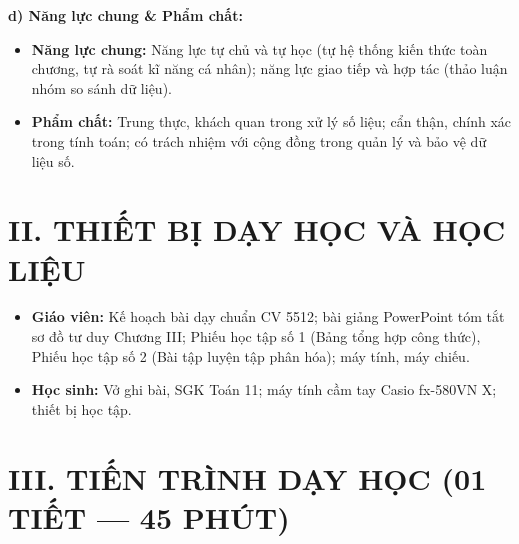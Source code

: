 \documentclass[12pt, a4paper]{article}
\begin{document}
\textbf{d) Năng lực chung \& Phẩm chất:}
\begin{itemize}[leftmargin=1.5em]
    \item \textbf{Năng lực chung:} Năng lực tự chủ và tự học (tự hệ thống kiến thức toàn chương, tự rà soát kĩ năng cá nhân); năng lực giao tiếp và hợp tác (thảo luận nhóm so sánh dữ liệu).
    \item \textbf{Phẩm chất:} Trung thực, khách quan trong xử lý số liệu; cẩn thận, chính xác trong tính toán; có trách nhiệm với cộng đồng trong quản lý và bảo vệ dữ liệu số.
\end{itemize}

\section*{II. THIẾT BỊ DẠY HỌC VÀ HỌC LIỆU}
\begin{itemize}[leftmargin=1.5em]
    \item \textbf{Giáo viên:} Kế hoạch bài dạy chuẩn CV 5512; bài giảng PowerPoint tóm tắt sơ đồ tư duy Chương III; Phiếu học tập số 1 (Bảng tổng hợp công thức), Phiếu học tập số 2 (Bài tập luyện tập phân hóa); máy tính, máy chiếu.
    \item \textbf{Học sinh:} Vở ghi bài, SGK Toán 11; máy tính cầm tay Casio fx-580VN X; thiết bị học tập.
\end{itemize}

\section*{III. TIẾN TRÌNH DẠY HỌC (01 TIẾT --- 45 PHÚT)}

\begin{center}
\end{center}
\end{document}
